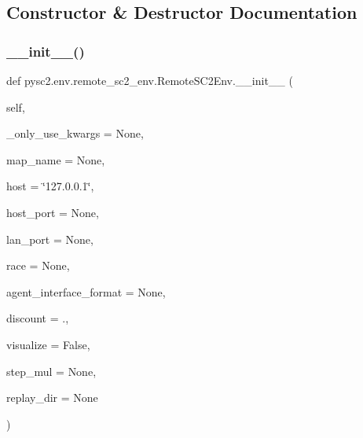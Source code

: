 \subsection{Constructor \& Destructor Documentation}
\mbox{\label{classpysc2_1_1env_1_1remote__sc2__env_1_1_remote_s_c2_env_a24badc19f47472b86e579ded70a36b97}} 
\subsubsection{\texorpdfstring{\+\_\+\+\_\+init\+\_\+\+\_\+()}{\_\_init\_\_()}}
{\footnotesize\ttfamily def pysc2.\+env.\+remote\+\_\+sc2\+\_\+env.\+Remote\+S\+C2\+Env.\+\_\+\+\_\+init\+\_\+\+\_\+ (\begin{DoxyParamCaption}\item[{}]{self,  }\item[{}]{\+\_\+only\+\_\+use\+\_\+kwargs = {\ttfamily None},  }\item[{}]{map\+\_\+name = {\ttfamily None},  }\item[{}]{host = {\ttfamily \char`\"{}127.0.0.1\char`\"{}},  }\item[{}]{host\+\_\+port = {\ttfamily None},  }\item[{}]{lan\+\_\+port = {\ttfamily None},  }\item[{}]{race = {\ttfamily None},  }\item[{}]{agent\+\_\+interface\+\_\+format = {\ttfamily None},  }\item[{}]{discount = {.},  }\item[{}]{visualize = {\ttfamily False},  }\item[{}]{step\+\_\+mul = {\ttfamily None},  }\item[{}]{replay\+\_\+dir = {\ttfamily None} }\end{DoxyParamCaption})}

